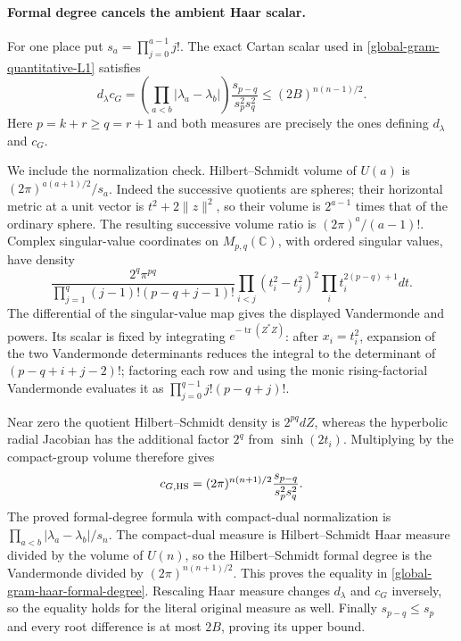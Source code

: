 \paragraph{Formal degree cancels the ambient Haar scalar.}
For one place put $s_a=\prod_{j=0}^{a-1}j!$.
The exact Cartan scalar used in
\eqref{global-gram-quantitative-L1} satisfies
\begin{equation}\label{global-gram-haar-formal-degree}
 d_\lambda c_G
   =\left(\prod_{a<b}|\lambda_a-\lambda_b|\right)
                         \frac{s_{p-q}}{s_p^2s_q^2}
   \le(2B)^{n(n-1)/2}.
\end{equation}
Here $p=k+r\ge q=r+1$ and both measures are precisely the
ones defining $d_\lambda$ and $c_G$.

We include the normalization check.  Hilbert--Schmidt volume of
$U(a)$ is $(2\pi)^{a(a+1)/2}/s_a$.
Indeed the successive quotients are spheres; their horizontal
metric at a unit vector is $t^2+2\|z\|^2$, so their volume
is $2^{a-1}$ times that of the ordinary sphere.  The resulting
successive volume ratio is $(2\pi)^a/(a-1)!$.
Complex singular-value coordinates on $M_{p,q}(\mathbb C)$,
with ordered singular values, have density
\[
 \frac{2^q\pi^{pq}}{\prod_{j=1}^q(j-1)!(p-q+j-1)!}
 \prod_{i<j}(t_i^2-t_j^2)^2\prod_i t_i^{2(p-q)+1}dt.
\]
The differential of the singular-value map gives the displayed
Vandermonde and powers.  Its scalar is fixed by integrating
$e^{-\operatorname{tr}(Z^*Z)}$: after $x_i=t_i^2$, expansion
of the two Vandermonde determinants reduces the integral to
the determinant of $(p-q+i+j-2)!$; factoring each row and
using the monic rising-factorial Vandermonde evaluates it as
$\prod_{j=0}^{q-1}j!(p-q+j)!$.

Near zero the quotient Hilbert--Schmidt density is $2^{pq}dZ$,
whereas the hyperbolic radial Jacobian has the additional
factor $2^q$ from $\sinh(2t_i)$.
Multiplying by the compact-group volume therefore gives
\[
        c_{G,\rm HS}=(2\pi)^{n(n+1)/2}
                                \frac{s_{p-q}}{s_p^2s_q^2}.
\]
The proved formal-degree formula with compact-dual normalization
is $\prod_{a<b}|\lambda_a-\lambda_b|/s_n$.
The compact-dual measure is Hilbert--Schmidt Haar measure divided
by the volume of $U(n)$, so the Hilbert--Schmidt formal degree
is the Vandermonde divided by $(2\pi)^{n(n+1)/2}$.
\cite{current-construction-record}
This proves the equality in \eqref{global-gram-haar-formal-degree}.
Rescaling Haar measure changes $d_\lambda$ and $c_G$ inversely,
so the equality holds for the literal original measure as well.
Finally $s_{p-q}\le s_p$ and every root difference is at most
$2B$, proving its upper bound.

